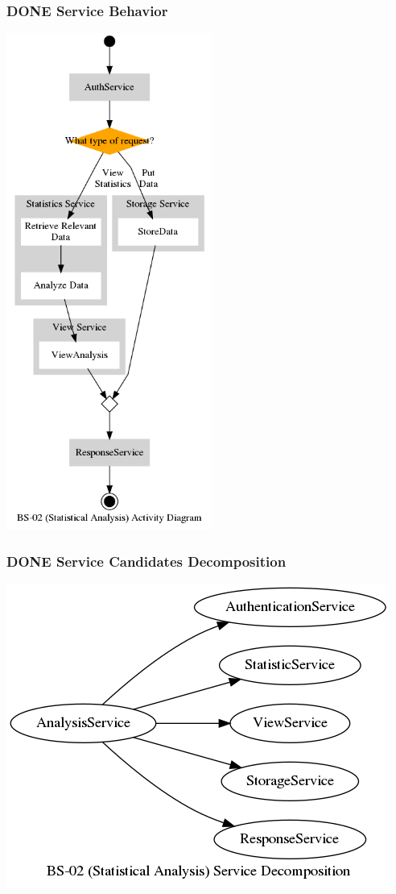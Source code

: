 \documentclass[11pt]{article}
\begin{document}
\subsubsection{{\bfseries\sffamily DONE} Service Behavior}
\label{sec:org3e531d1}
\begin{center}
\includegraphics[height=16.3cm]{res/bs_02_act.png}
\end{center}
\subsubsection{{\bfseries\sffamily DONE} Service Candidates Decomposition}
\label{sec:orga102349}
\begin{center}
\includegraphics[width=.9\linewidth]{res/bs_02_dcmp.png}
\end{center}
\newpage
\end{document}
